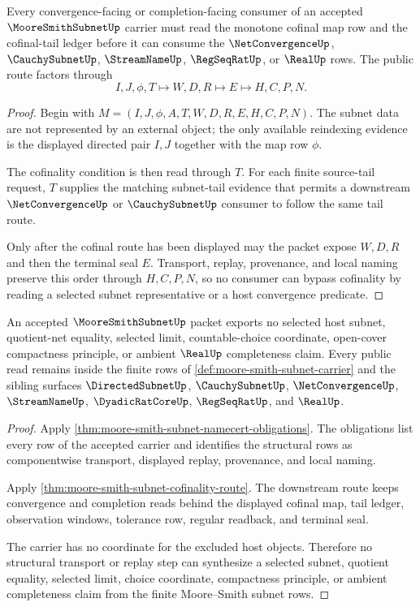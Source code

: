 \begin{theorem}
\label{thm:moore-smith-subnet-cofinality-route}
Every convergence-facing or completion-facing consumer of an accepted $\MooreSmithSubnetUp$ carrier must read the monotone cofinal map row and the cofinal-tail ledger before it can consume the $\NetConvergenceUp$, $\CauchySubnetUp$, $\StreamNameUp$, $\RegSeqRatUp$, or $\RealUp$ rows. The public route factors through
$$
I,J,\phi,T \longmapsto W,D,R \longmapsto E \longmapsto H,C,P,N .
$$
\end{theorem}
\begin{proof}
Begin with $M=(I,J,\phi,A,T,W,D,R,E,H,C,P,N)$. The subnet data are not represented by an external object; the only available reindexing evidence is the displayed directed pair $I,J$ together with the map row $\phi$.

The cofinality condition is then read through $T$. For each finite source-tail request, $T$ supplies the matching subnet-tail evidence that permits a downstream $\NetConvergenceUp$ or $\CauchySubnetUp$ consumer to follow the same tail route.

Only after the cofinal route has been displayed may the packet expose $W,D,R$ and then the terminal seal $E$. Transport, replay, provenance, and local naming preserve this order through $H,C,P,N$, so no consumer can bypass cofinality by reading a selected subnet representative or a host convergence predicate.
\end{proof}

\begin{theorem}
\label{thm:moore-smith-subnet-nonescape}
An accepted $\MooreSmithSubnetUp$ packet exports no selected host subnet, quotient-net equality, selected limit, countable-choice coordinate, open-cover compactness principle, or ambient $\RealUp$ completeness claim. Every public read remains inside the finite rows of \autoref{def:moore-smith-subnet-carrier} and the sibling surfaces $\DirectedSubnetUp$, $\CauchySubnetUp$, $\NetConvergenceUp$, $\StreamNameUp$, $\DyadicRatCoreUp$, $\RegSeqRatUp$, and $\RealUp$.
\end{theorem}
\begin{proof}
Apply \autoref{thm:moore-smith-subnet-namecert-obligations}. The obligations list every row of the accepted carrier and identifies the structural rows as componentwise transport, displayed replay, provenance, and local naming.

Apply \autoref{thm:moore-smith-subnet-cofinality-route}. The downstream route keeps convergence and completion reads behind the displayed cofinal map, tail ledger, observation windows, tolerance row, regular readback, and terminal seal.

The carrier has no coordinate for the excluded host objects. Therefore no structural transport or replay step can synthesize a selected subnet, quotient equality, selected limit, choice coordinate, compactness principle, or ambient completeness claim from the finite Moore--Smith subnet rows.
\end{proof}

